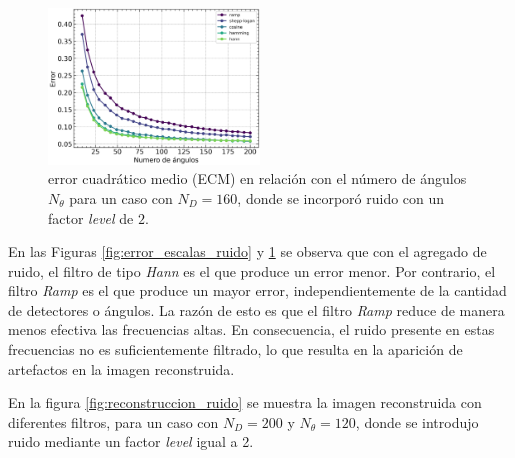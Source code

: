 \documentclass[11pt, twocolumn]{article}
\begin{document}
\begin{figure} [htbp]
    \centering
    \includegraphics*[width=0.5\textwidth]{./images/ej_5/angle_error_noisy.png}
    \caption{error cuadrático medio (ECM) en relación con el número de ángulos $N_\theta$ para un caso con $N_D = 160$, donde se incorporó ruido con un factor \textit{level} de $2$.}
    \label{fig:error_angulos_ruido}
\end{figure}

En las Figuras \ref{fig:error_escalas_ruido} y \ref{fig:error_angulos_ruido} se observa que con el agregado de ruido, el filtro de tipo \textit{Hann} es el que produce un error menor. Por contrario, el filtro \textit{Ramp} es el que produce un mayor error, independientemente de la cantidad de detectores o ángulos. La razón de esto es que el filtro \textit{Ramp} reduce de manera menos efectiva las frecuencias altas. En consecuencia, el ruido presente en estas frecuencias no es suficientemente filtrado, lo que resulta en la aparición de artefactos en la imagen reconstruida.

En la figura \ref{fig:reconstruccion_ruido} se muestra la imagen reconstruida con diferentes filtros, para un caso con $N_D = 200$ y $N_\theta = 120$, donde se introdujo ruido mediante un factor \textit{level} igual a 2.
\end{document}
